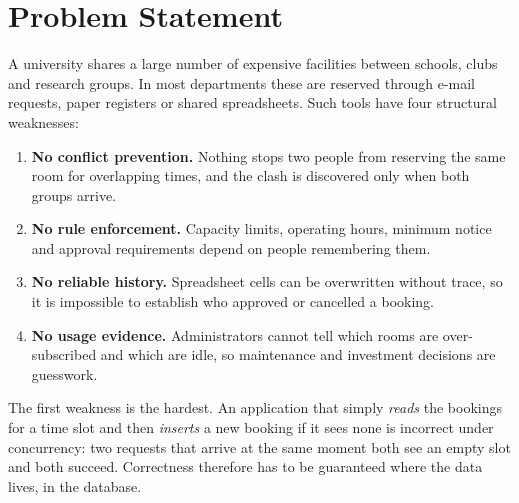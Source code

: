 \documentclass[12pt,a4paper,oneside]{report}
\renewcommand{\_}{\origus\allowbreak}
\begin{document}
\section{Problem Statement}
A university shares a large number of expensive facilities between schools, clubs and research groups. In most departments these are reserved through e-mail requests, paper registers or shared spreadsheets. Such tools have four structural weaknesses:
\begin{enumerate}
  \item \textbf{No conflict prevention.} Nothing stops two people from reserving the same room for overlapping times, and the clash is discovered only when both groups arrive.
  \item \textbf{No rule enforcement.} Capacity limits, operating hours, minimum notice and approval requirements depend on people remembering them.
  \item \textbf{No reliable history.} Spreadsheet cells can be overwritten without trace, so it is impossible to establish who approved or cancelled a booking.
  \item \textbf{No usage evidence.} Administrators cannot tell which rooms are over-subscribed and which are idle, so maintenance and investment decisions are guesswork.
\end{enumerate}

The first weakness is the hardest. An application that simply \emph{reads} the bookings for a time slot and then \emph{inserts} a new booking if it sees none is incorrect under concurrency: two requests that arrive at the same moment both see an empty slot and both succeed. Correctness therefore has to be guaranteed where the data lives, in the database.
\end{document}
